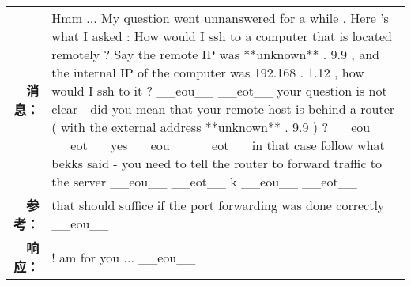 \begin{tabularx}{\textwidth}{@{}rX@{}}%
\toprule%
\midrule%
\textbf{消息：}&Hmm ... My question went unnanswered for a while . Here 's what I asked : How would I ssh to a computer that is located remotely ? Say the remote IP was **unknown** . 9.9 , and the internal IP of the computer was 192.168 . 1.12 , how would I ssh to it ? \_\_eou\_\_ \_\_eot\_\_ your question is not clear {-} did you mean that your remote host is behind a router ( with the external address **unknown** . 9.9 ) ? \_\_eou\_\_ \_\_eot\_\_ yes \_\_eou\_\_ \_\_eot\_\_ in that case follow what bekks said {-} you need to tell the router to forward traffic to the server \_\_eou\_\_ \_\_eot\_\_ k \_\_eou\_\_ \_\_eot\_\_\\%
\textbf{参考：}&that should suffice if the port forwarding was done correctly \_\_eou\_\_\\%
\textbf{响应：}&! am for you ... \_\_eou\_\_\\%
\midrule%

\end{tabularx}
